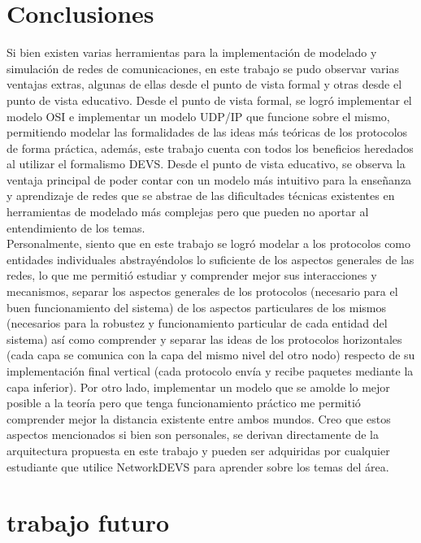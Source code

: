 \documentclass[10pt,a4paper]{article}
\begin{document}
\section{Conclusiones}
Si bien existen varias herramientas para la implementación de modelado y simulación de redes de comunicaciones, en este trabajo se pudo observar varias ventajas extras, algunas de ellas desde el punto de vista formal y otras desde el punto de vista educativo. Desde el punto de vista formal, se logró implementar el modelo OSI e implementar un modelo UDP/IP que funcione sobre el mismo, permitiendo modelar las formalidades de las ideas más teóricas de los protocolos de forma práctica, además, este trabajo cuenta con todos los beneficios heredados al utilizar el formalismo DEVS. Desde el punto de vista educativo, se observa la ventaja principal de poder contar con un modelo más intuitivo para la enseñanza y aprendizaje de redes que se abstrae de las dificultades técnicas existentes en herramientas de modelado más complejas pero que pueden no aportar al entendimiento de los temas. \\

Personalmente, siento que en este trabajo se logró modelar a los protocolos como entidades individuales abstrayéndolos lo suficiente de los aspectos generales de las redes, lo que me permitió estudiar y comprender mejor sus interacciones y mecanismos, separar los aspectos generales de los protocolos (necesario para el buen funcionamiento del sistema) de los aspectos particulares de los mismos (necesarios para la robustez y funcionamiento particular de cada entidad del sistema) así como comprender y separar las ideas de los protocolos horizontales (cada capa se comunica con la capa del mismo nivel del otro nodo) respecto de su implementación final vertical (cada protocolo envía y recibe paquetes mediante la capa inferior). Por otro lado, implementar un modelo que se amolde lo mejor posible a la teoría pero que tenga funcionamiento práctico me permitió comprender mejor la distancia existente entre ambos mundos. Creo que estos aspectos mencionados si bien son personales, se derivan directamente de la arquitectura propuesta en este trabajo y pueden ser adquiridas por cualquier estudiante que utilice NetworkDEVS para aprender sobre los temas del área.

\section{trabajo futuro}
\end{document}

